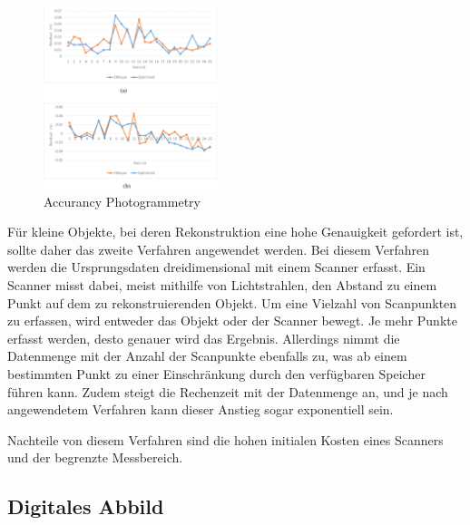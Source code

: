\begin{figure}[h]
    \centering
    \includegraphics[height=150pt]{images/photogammatry_accurancy.PNG}
    \caption{Accurancy Photogrammetry}
    \label{fig:photogammatryAccuracy}
\end{figure}

Für kleine Objekte, bei deren Rekonstruktion eine hohe Genauigkeit gefordert ist, 
sollte daher das zweite Verfahren angewendet werden. Bei diesem Verfahren werden
die Ursprungsdaten dreidimensional mit einem Scanner erfasst. Ein Scanner misst dabei, 
meist mithilfe von Lichtstrahlen, den Abstand zu einem Punkt auf dem zu 
rekonstruierenden Objekt. Um eine Vielzahl von Scanpunkten zu erfassen, 
wird entweder das Objekt oder der Scanner bewegt. Je mehr Punkte erfasst werden, 
desto genauer wird das Ergebnis. Allerdings nimmt die Datenmenge mit der Anzahl der 
Scanpunkte ebenfalls zu, was ab einem bestimmten Punkt zu einer Einschränkung durch den 
verfügbaren Speicher führen kann. Zudem steigt die Rechenzeit mit der Datenmenge an, 
und je nach angewendetem Verfahren kann dieser Anstieg sogar exponentiell sein.

Nachteile von diesem Verfahren sind die hohen initialen Kosten eines Scanners 
und der begrenzte Messbereich. 

\subsection{Digitales Abbild}

